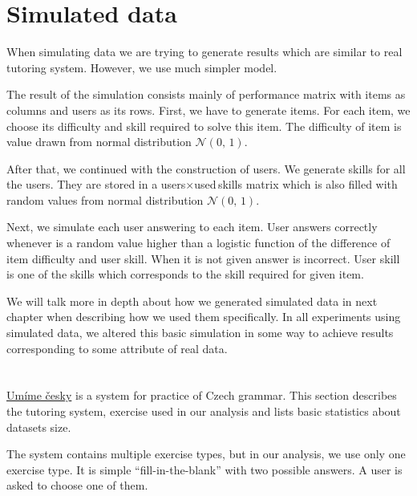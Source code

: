\documentclass[
  digital, %
  table,   %
  nolof,     %
  nolot,     %
  nocover,
  color,
  final, %
]{fithesis3}
\begin{document}

\section{Simulated data}\label{simulated-data}

When simulating data we are trying to generate results which are similar to real tutoring system. However, we use much simpler model.

The result of the simulation consists mainly of performance matrix with items as columns and users as its rows. First, we have to generate items. For each item, we choose its difficulty and skill required to solve this item. The difficulty of item is value drawn from normal distribution $\mathcal{N}(0,\,1)$.

After that, we continued with the construction of users. We generate skills for all the users. They are stored in a users$\times$used\,skills matrix which is also filled with random values from normal distribution $\mathcal{N}(0,\,1)$.

Next, we simulate each user answering to each item. User answers correctly whenever is a random value higher than a logistic function of the difference of item difficulty and user skill. When it is not given answer is incorrect. User skill is one of the skills which corresponds to the skill required for given item.

We will talk more in depth about how we generated simulated data in next chapter when describing how we used them specifically. In all experiments using simulated data, we altered this basic simulation in some way to achieve results corresponding to some attribute of real data.


\section{\umimeCesky{}}\label{umime-cesky}


\href{https://umimecesky.cz/}{Umíme česky} is a system for practice of Czech grammar. This section describes the tutoring system, exercise used in our analysis and lists basic statistics about datasets size.

The system contains multiple exercise types, but in our analysis, we use only one exercise type. It is simple ``fill-in-the-blank'' with two possible answers. A user is asked to choose one of them.
\end{document}
